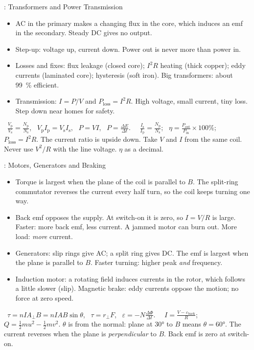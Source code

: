 \begin{summarybox}[fontupper=\small]{: Transformers and Power Transmission}
\begin{itemize}[itemsep=0pt, topsep=0pt]
  \item AC in the primary makes a changing flux in the core, which induces an emf in the
        secondary. Steady DC gives no output.
  \item Step-up: voltage up, current down. Power out is never more than power in.
  \item Losses and fixes: flux leakage (closed core); $I^2R$ heating (thick copper); eddy
        currents (laminated core); hysteresis (soft iron). Big transformers: about
        \qty{99}{\percent} efficient.
  \item Transmission: $I = P/V$ and $P_\mathrm{loss} = I^2R$. High voltage, small current,
        tiny loss. Step down near homes for safety.
\end{itemize}
 \sumSheet\ $\frac{V_\mathrm{p}}{V_\mathrm{s}} =
\frac{N_\mathrm{p}}{N_\mathrm{s}}$, \ $V_\mathrm{p} I_\mathrm{p} = V_\mathrm{s} I_\mathrm{s}$,
\ $P = VI$, \ $P = \frac{\Delta E}{\Delta t}$. \ \sumLearn\ $\frac{I_\mathrm{s}}{I_\mathrm{p}}
= \frac{N_\mathrm{p}}{N_\mathrm{s}}$; \ $\eta = \frac{P_\mathrm{out}}{P_\mathrm{in}} \times
100\%$; \ $P_\mathrm{loss} = I^2R$.
 The current ratio is upside down. Take $V$ and $I$ from the same coil. Never
use $V^2/R$ with the line voltage. $\eta$ as a decimal.
\end{summarybox}

\begin{summarybox}[fontupper=\small]{: Motors, Generators and Braking}
\begin{itemize}[itemsep=0pt, topsep=0pt]
  \item Torque is largest when the plane of the coil is parallel to $B$. The split-ring
        commutator reverses the current every half turn, so the coil keeps turning one way.
  \item Back emf opposes the supply. At switch-on it is zero, so $I = V/R$ is large. Faster:
        more back emf, less current. A jammed motor can burn out. More load: \emph{more}
        current.
  \item Generators: slip rings give AC; a split ring gives DC. The emf is largest when the
        plane is parallel to $B$. Faster turning: higher peak \emph{and} frequency.
  \item Induction motor: a rotating field induces currents in the rotor, which follows a
        little slower (slip). Magnetic brake: eddy currents oppose the motion; no force at
        zero speed.
\end{itemize}
 \sumSheet\ $\tau = nIA_\perp B = nIAB\sin\theta$, \
$\tau = r_\perp F$, \ $\varepsilon = -N\frac{\Delta\Phi}{\Delta t}$. \ \sumLearn\
$I = \frac{V - \varepsilon_\mathrm{back}}{R}$; \ $Q = \frac{1}{2}mu^2 - \frac{1}{2}mv^2$.
\sumhead{Traps} $\theta$ is from the normal: plane at \ang{30} to $B$ means $\theta = \ang{60}$.
The current reverses when the plane is \emph{perpendicular} to $B$. Back emf is zero at
switch-on.
\end{summarybox}
